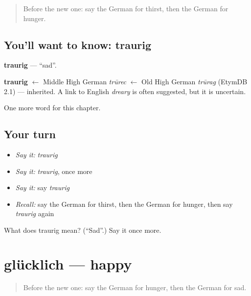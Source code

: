 \label{lesson:GE-C60-traurig}



\begin{quote}
Before the new one: say the German for thirst, then the German for hunger.
\end{quote}

\subsection*{You'll want to know: traurig}
\textbf{traurig} — \textquotedblleft{}sad\textquotedblright{}.

\begin{cousinweb}
\textbf{traurig} $\leftarrow$ Middle High German \emph{trūrec} $\leftarrow$ Old High German \emph{trūrag} (EtymDB 2.1) — inherited. A link to English \emph{dreary} is often suggested, but it is uncertain.
\end{cousinweb}

\begin{grammarlens}[title={What you've built}]
One more word for this chapter.
\end{grammarlens}

\subsection*{Your turn}
\begin{itemize}
\raggedright
  \item \emph{Say it:} \emph{traurig}
  \item \emph{Say it:} \emph{traurig}, once more
  \item \emph{Say it:} say \emph{traurig}
  \item \emph{Recall:} say the German for thirst, then the German for hunger, then say \emph{traurig} again
\end{itemize}

\begin{tcolorbox}[breakable,colback=teal!4,colframe=teal!35!black,title={Before you move on}]
What does traurig mean? (\textquotedblleft{}Sad\textquotedblright{}.) Say it once more.
\end{tcolorbox}
\section[glücklich]{glücklich — happy}

\label{lesson:GE-C60-gluecklich}



\begin{quote}
Before the new one: say the German for hunger, then the German for sad.
\end{quote}

